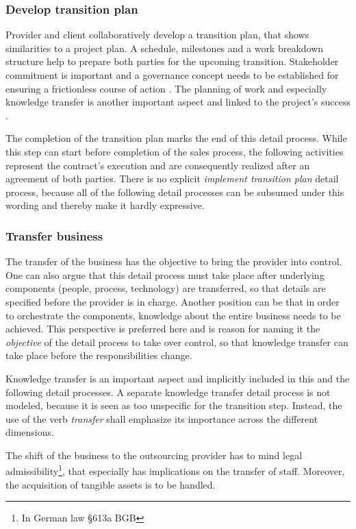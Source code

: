 	\subsubsection{Develop transition plan}
	Provider and client collaboratively develop a transition plan, that shows similarities to a project plan. A schedule, milestones and a work breakdown structure help to prepare both parties for the upcoming transition. Stakeholder commitment is important and a governance concept needs to be established for ensuring a frictionless course of action \citep{itgov2005}. The planning of work and especially knowledge transfer is another important aspect and linked to the project's success \citep{deloittehandbook}. 
	
	The completion of the transition plan marks the end of this detail process. While this step can start before completion of the sales process, the following activities represent the contract's execution and are consequently realized after an agreement of both parties. There is no explicit \textit{implement transition plan} detail process, because all of the following detail processes can be subsumed under this wording and thereby make it hardly expressive. 
	
	\subsubsection{Transfer business}
	
	The transfer of the business has the objective to bring the provider into control. One can also argue that this detail process must take place after underlying components (\ie people, process, technology) are transferred, so that details are specified before the provider is in charge. Another position can be that in order to orchestrate the components, knowledge about the entire business needs to be achieved. This perspective is preferred here and is reason for naming it the \textit{objective} of the detail process to take over control, so that knowledge transfer can take place before the responsibilities change. 
	
	Knowledge transfer is an important aspect and implicitly included in this and the following detail processes. A separate knowledge transfer detail process is not modeled, because it is seen as too unspecific for the transition step. Instead, the use of the verb \textit{transfer} shall emphasize its importance across the different dimensions. 
	
	The shift of the business to the outsourcing provider has to mind legal admissibility\footnote{In German law \cf §613a BGB }, that especially has implications on the transfer of staff. Moreover, the acquisition of tangible assets is to be handled. 
	
